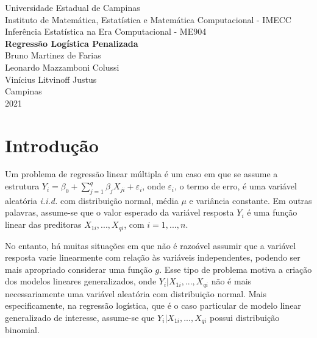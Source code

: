 \documentclass[
  12pt,
]{article}
\author{}
\date{\vspace{-2.5em}}
\begin{document}
\begin{titlepage} 
\begin{center} 


{\large Universidade Estadual de Campinas}\\ [0.2cm] 
{\large Instituto de Matemática, Estatística e Matemática Computacional - IMECC}\\ [0.2cm] 
{\large Inferência Estatística na Era Computacional - ME904}\\ [6cm]


{\bf \Large Regressão Logística Penalizada}\\ [8cm]

{\large Bruno Martinez de Farias} \\ [0.2cm]
{\large Leonardo Mazzamboni Colussi} \\ [0.2cm]
{\large Vinícius Litvinoff Justus} \\ [2cm]  
 


{\large Campinas}\\ [0.2cm]
{\large 2021}

\end{center}
\end{titlepage}

\newpage
{}
\tableofcontents
\cleardoublepage

\section{Introdução}

\quad Um problema de regressão linear múltipla é um caso em que se
assume a estrutura
\(Y_i = \beta_0 + \sum_{j=1}^q \beta_j X_{ji} + \varepsilon_i\), onde
\(\varepsilon_i\), o termo de erro, é uma variável aleatória
\emph{i.i.d.} com distribuição normal, média \(\mu\) e variância
constante. Em outras palavras, assume-se que o valor esperado da
variável resposta \(Y_i\) é uma função linear das preditoras
\(X_{1i}, ..., X_{qi}\), com \(i = 1, ..., n\).

\quad No entanto, há muitas situações em que não é razoável assumir que
a variável resposta varie linearmente com relação às variáveis
independentes, podendo ser mais apropriado considerar uma função \(g\).
Esse tipo de problema motiva a criação dos modelos lineares
generalizados, onde \(Y_i|X_{1i}, ..., X_{qi}\) não é mais
necessariamente uma variável aleatória com distribuição normal. Mais
especificamente, na regressão logística, que é o caso particular de
modelo linear generalizado de interesse, assume-se que
\(Y_i|X_{1i}, ..., X_{qi}\) possui distribuição binomial.
\end{document}
